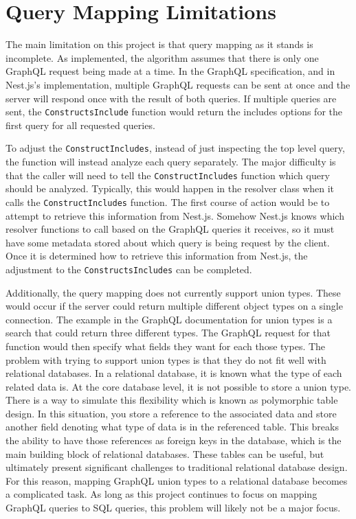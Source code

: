\section{Query Mapping Limitations}
The main limitation on this project is that query mapping as it stands is incomplete. As implemented, the algorithm assumes that there is only one GraphQL request being made at a time.  In the GraphQL specification, and in Nest.js's implementation, multiple GraphQL requests can be sent at once and the server will respond once with the result of both queries.  If multiple queries are sent, the \verb!ConstructsInclude! function would return the includes options for the first query for all requested queries.

To adjust the \verb!ConstructIncludes!, instead of just inspecting the top level query, the function will instead analyze each query separately.  The major difficulty is that the caller will need to tell the \verb!ConstructIncludes! function which query should be analyzed. Typically, this would happen in the resolver class when it calls the \verb!ConstructIncludes! function. The first course of action would be to attempt to retrieve this information from Nest.js.  Somehow Nest.js knows which resolver functions to call based on the GraphQL queries it receives, so it must have some metadata stored about which query is being request by the client.  Once it is determined how to retrieve this information from Nest.js, the adjustment to the \verb!ConstructsIncludes! can be completed.

Additionally, the query mapping does not currently support union types.  These would occur if the server could return multiple different object types on a single connection.  The example in the GraphQL documentation for union types is a search that could return three different types.  The GraphQL request for that function would then specify what fields they want for each those types.  The problem with trying to support union types is that they do not fit well with relational databases.  In a relational database, it is known what the type of each related data is.  At the core database level, it is not possible to store a union type.  There is a way to simulate this flexibility which is known as polymorphic table design.  In this situation, you store a reference to the associated data and store another field denoting what type of data is in the referenced table.  This breaks the ability to have those references as foreign keys in the database, which is the main building block of relational databases. These tables can be useful, but ultimately present significant challenges to traditional relational database design.  For this reason, mapping GraphQL union types to a relational database becomes a complicated task.  As long as this project continues to focus on mapping GraphQL queries to SQL queries, this problem will likely not be a major focus.

